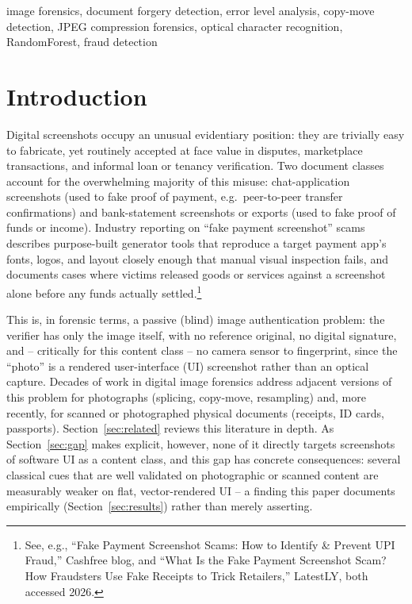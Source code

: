 \documentclass[conference]{IEEEtran}
\begin{document}
\begin{IEEEkeywords}
image forensics, document forgery detection, error level analysis, copy-move detection, JPEG compression forensics, optical character recognition, RandomForest, fraud detection
\end{IEEEkeywords}

\section{Introduction}
\label{sec:intro}

Digital screenshots occupy an unusual evidentiary position: they are trivially
easy to fabricate, yet routinely accepted at face value in disputes,
marketplace transactions, and informal loan or tenancy verification. Two
document classes account for the overwhelming majority of this misuse:
chat-application screenshots (used to fake proof of payment, e.g.\ peer-to-peer
transfer confirmations) and bank-statement screenshots or exports (used to
fake proof of funds or income). Industry reporting on ``fake payment
screenshot'' scams describes purpose-built generator tools that reproduce a
target payment app's fonts, logos, and layout closely enough that manual
visual inspection fails, and documents cases where victims released goods or
services against a screenshot alone before any funds actually
settled.\footnote{See, e.g., ``Fake Payment Screenshot Scams: How to Identify
\& Prevent UPI Fraud,'' Cashfree blog, and ``What Is the Fake Payment
Screenshot Scam? How Fraudsters Use Fake Receipts to Trick Retailers,''
LatestLY, both accessed 2026.}

This is, in forensic terms, a passive (blind) image authentication problem:
the verifier has only the image itself, with no reference original, no
digital signature, and -- critically for this content class -- no camera
sensor to fingerprint, since the ``photo'' is a rendered user-interface (UI)
screenshot rather than an optical capture. Decades of work in digital image
forensics address adjacent versions of this problem for photographs
(splicing, copy-move, resampling) and, more recently, for scanned or
photographed physical documents (receipts, ID cards, passports).
Section~\ref{sec:related} reviews this literature in depth. As
Section~\ref{sec:gap} makes explicit, however, none of it directly targets
screenshots of software UI as a content class, and this gap has concrete
consequences: several classical cues that are well validated on photographic
or scanned content are measurably weaker on flat, vector-rendered UI -- a
finding this paper documents empirically (Section~\ref{sec:results}) rather
than merely asserting.
\end{document}
